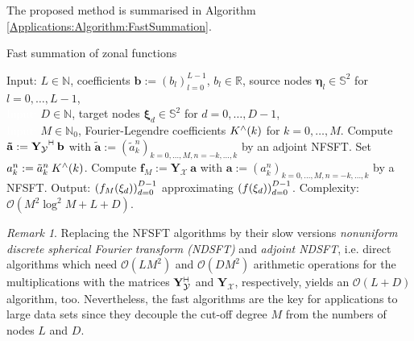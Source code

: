 \documentclass[11pt,a4paper,twoside,bibtotoc]{scrartcl}
\theoremstyle{plain}
\theoremstyle{definition}
\theoremstyle{remark}
\newtheorem{remark}[theorem]{Remark}
\newcommand{\N}{\ensuremath{\mathbb{N}}}
\newcommand{\NZ}{\ensuremath{\mathbb{N}_{0}}}
\newcommand{\R}{\ensuremath{\mathbb{R}}}
\newcommand{\adj}{{\vdash \hspace*{-1.72mm} \dashv}}
\newcommand{\fun}[2]{\ensuremath{#1{\hspace{-0.4ex}}\left(#2\right)}}
\def\invisible#1{\textcolor{white}{#1}}
\numberwithin{equation}{section}
\numberwithin{table}{section}
\numberwithin{figure}{section}
\begin{document}
The proposed method is summarised in Algorithm \ref{Applications:Algorithm:FastSummation}.
\begin{algorithm}[ht]
  \caption{Fast summation of zonal functions}
  \label{Applications:Algorithm:FastSummation}    
  \begin{algorithmic}
    \STATE Input:             $L \in \N$, coefficients $\mathbf{b}:=\left(b_{l}\right)_{l=0}^{L-1}$, 
                              $b_{l} \in \R$, source nodes $\mathbf{\eta}_{l} \in \mathbb{S}^2$ for $l=0,
                              \ldots,L-1$, \\ 
    \STATE \invisible{Input:} $D \in \N$, target nodes $\mathbf{\xi}_{d} \in \mathbb{S}^2$ for $d=0,\ldots,D-1$,\\
    \STATE \invisible{Input:} $M \in \NZ$, Fourier-Legendre coefficients $\fun{K^{\wedge}}{k}$ for $k=0,\ldots,M$.  
    \STATE
    \STATE
    \STATE Compute $\mathbf{\tilde{a}} := \mathbf{Y_{\mathcal{Y}}}^{\adj} \: \mathbf{b}$ 
           with $\mathbf{\tilde{a}} := (\tilde{a}_k^n)_{k=0,\ldots,M, n=-k,\ldots,k}$ 
           by an adjoint NFSFT.
        \STATE Set $a_{k}^n := \tilde{a}_{k}^n \: \fun{K^{\wedge}}{k}$.
      \ENDFOR
    \ENDFOR
    \STATE Compute $\mathbf{f}_M := \mathbf{Y_{\mathcal{X}}} \: \mathbf{a}$ with 
           $\mathbf{a} := \left(a_k^n\right)_{k=0,\ldots,M, n=-k,\ldots,k}$ 
           by a NFSFT.
    \STATE
    \STATE Output: $\left(\fun{f_M}{\mathbf{\xi}_{d}}\right)_{d=0}^{D-1}$ approximating
                    $\left(\fun{f}{\mathbf{\xi}_{d}}\right)_{d=0}^{D-1}$.
    \STATE
    \STATE Complexity: $\mathcal{O}\left(M^2 \log^2M + L + D\right)$.  
\end{algorithmic}
\end{algorithm}

\begin{remark}
Replacing the NFSFT algorithms by their slow versions \emph{nonuniform 
discrete spherical Fourier transform (NDSFT)} and \emph{adjoint NDSFT}, i.e. 
direct algorithms which need 
$\mathcal{O}\left(L M^2\right)$ and
$\mathcal{O}\left(D M^2\right)$ arithmetic operations for the multiplications with the 
matrices $\mathbf{Y}_{\mathcal{Y}}^{\adj}$ and $\mathbf{Y}_{\mathcal{X}}$, respectively, 
yields an $\mathcal{O}\left(L+D\right)$ algorithm, too. Nevertheless, the fast 
algorithms are the key for applications to large data sets since they 
decouple the cut-off degree $M$ from the numbers of nodes $L$ and $D$.
\end{remark}
\end{document}
